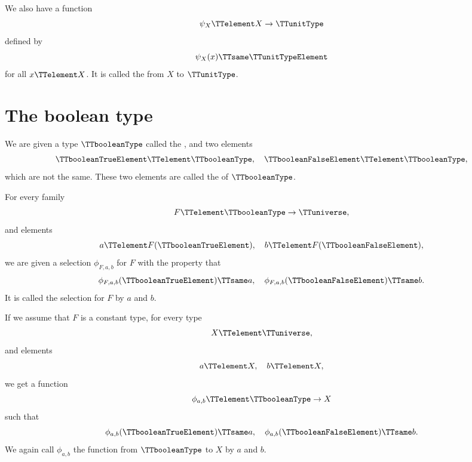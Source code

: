 \documentclass{article}
\begin{document}
We also have a function
\begin{equation*}
  \psi_X \TTelement X \to \TTunitType
\end{equation*}
defined by
\begin{equation*}
  \psi_X(x) \TTsame \TTunitTypeElement
\end{equation*}
for all $x \TTelement X$.  It is called the  from $X$ to $\TTunitType$.

\section{The boolean type}
\label{sec:boolean-type}

We are given a type $\TTbooleanType$ called the , and two elements
\begin{equation*}
  \TTbooleanTrueElement \TTelement \TTbooleanType, \quad
  \TTbooleanFalseElement \TTelement \TTbooleanType,
\end{equation*}
which are not the same.  These two elements are called the
 of $\TTbooleanType$.

For every family
\begin{equation*}
  F \TTelement \TTbooleanType \to \TTuniverse,
\end{equation*}
and elements
\begin{equation*}
  a \TTelement F(\TTbooleanTrueElement), \quad
  b \TTelement F(\TTbooleanFalseElement),
\end{equation*}
we are given a selection $\phi_{F,a,b}$ for $F$ with the property that
\begin{equation*}
  \phi_{F,a,b}(\TTbooleanTrueElement) \TTsame a, \quad
  \phi_{F,a,b}(\TTbooleanFalseElement) \TTsame b.
\end{equation*}
It is called the selection for $F$  by $a$ and
$b$.

If we assume that $F$ is a constant type, for every type
\begin{equation*}
  X \TTelement \TTuniverse,
\end{equation*}
and elements
\begin{equation*}
  a \TTelement X, \quad
  b \TTelement X,
\end{equation*}
we get a function
\begin{equation*}
  \phi_{a,b} \TTelement \TTbooleanType \to X
\end{equation*}
such that
\begin{equation*}
  \phi_{a,b}(\TTbooleanTrueElement) \TTsame a, \quad
  \phi_{a,b}(\TTbooleanFalseElement) \TTsame b.
\end{equation*}
We again call $\phi_{a,b}$ the function from $\TTbooleanType$ to $X$
 by $a$ and $b$.
\end{document}
